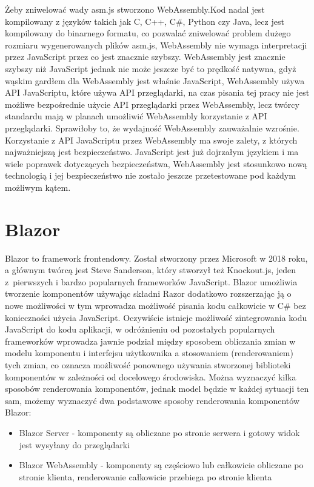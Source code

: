 \documentclass[12pt,a4paper,oneside]{book}
\begin{document}
Żeby zniwelować wady asm.js stworzono WebAssembly.Kod nadal jest kompilowany z języków takich jak C, C++, C\#, Python czy Java, lecz jest kompilowany do binarnego formatu, co pozwalać zniwelować problem dużego rozmiaru wygenerowanych plików asm.js, WebAssembly nie wymaga interpretacji przez JavaScript przez co jest znacznie szybszy. WebAssembly jest znacznie szybszy niż JavaScript jednak nie może jeszcze być to prędkość natywna, gdyż wąskim gardłem dla WebAssembly jest właśnie JavaScript, WebAssembly używa API JavaScriptu, które używa API przeglądarki, na czas pisania tej pracy nie jest możliwe bezpośrednie użycie API przeglądarki przez WebAssembly, lecz twórcy standardu mają w planach umożliwić WebAssembly korzystanie z API przeglądarki. Sprawiłoby to, że wydajność WebAssembly zauważalnie wzrośnie. Korzystanie z API JavaScriptu przez WebAssembly ma swoje zalety, z których najważniejszą jest bezpieczeństwo. JavaScript jest już dojrzałym językiem i ma wiele poprawek dotyczących bezpieczeństwa, WebAssembly jest stosunkowo nową technologią i jej bezpieczeństwo nie zostało jeszcze przetestowane pod każdym możliwym kątem.

\section{Blazor}

Blazor to framework frontendowy. Został stworzony przez Microsoft w 2018 roku, a głównym twórcą jest Steve Sanderson, który stworzył też Knockout.js, jeden z~pierwszych i bardzo popularnych frameworków JavaScript. Blazor umożliwia tworzenie komponentów używając składni Razor dodatkowo rozszerzając ją o nowe możliwości w tym wprowadza możliwość pisania kodu całkowicie w C\# bez konieczności użycia JavaScript. Oczywiście istnieje możliwość zintegrowania kodu JavaScript do kodu aplikacji, w odróżnieniu od pozostałych popularnych frameworków wprowadza jawnie podział między sposobem obliczania zmian w modelu komponentu i interfejsu użytkownika a stosowaniem (renderowaniem) tych zmian, co oznacza możliwość ponownego używania stworzonej biblioteki komponentów w zależności od docelowego środowiska. Można wyznaczyć kilka sposobów renderowania komponentów, jednak model będzie w każdej sytuacji ten sam, możemy wyznaczyć dwa podstawowe sposoby renderowania komponentów Blazor:

\begin{itemize}
  \item Blazor Server - komponenty są obliczane po stronie serwera i gotowy widok jest wysyłany do przeglądarki
  \item Blazor WebAssembly - komponenty są częściowo lub całkowicie obliczane po stronie klienta, renderowanie całkowicie przebiega po stronie klienta
\end{itemize}
\end{document}
